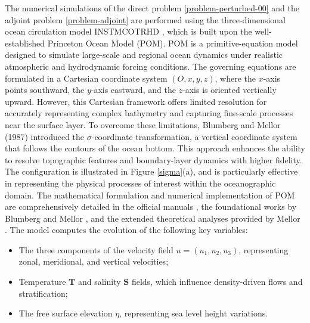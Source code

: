 \documentclass[a4paper,12pt,reqno,natbib]{amsart}
\begin{document}
The numerical simulations of the direct problem \eqref{problem-perturbed-00} and the adjoint problem \eqref{problem-adjoint} are performed using the three-dimensional ocean circulation model INSTMCOTRHD \cite{alioua, marwa}, which is built upon the well-established Princeton Ocean Model (POM). POM is a primitive-equation model designed to simulate large-scale and regional ocean dynamics under realistic atmospheric and hydrodynamic forcing conditions. The governing equations are formulated in a Cartesian coordinate system \( (O, x, y, z) \), where the \( x \)-axis points southward, the \( y \)-axis eastward, and the \( z \)-axis is oriented vertically upward. However, this Cartesian framework offers limited resolution for accurately representing complex bathymetry and capturing fine-scale processes near the surface layer.  To overcome these limitations, Blumberg and Mellor (1987) introduced the $\sigma$-coordinate transformation, a vertical coordinate system that follows the contours of the ocean bottom. This approach enhances the ability to resolve topographic features and boundary-layer dynamics with higher fidelity. The configuration is illustrated in Figure \ref{sigma}(a), and is particularly effective in representing the physical processes of interest within the oceanographic domain. The mathematical formulation and numerical implementation of POM are comprehensively detailed in the official manuals \cite{guide, guide2002}, the foundational works by Blumberg and Mellor \cite{mellor80, mellor87}, and the extended theoretical analyses provided by Mellor \cite{mellor85, mellor98}. The model computes the evolution of the following key variables:
\begin{itemize}
    \item The three components of the velocity field \( u = (u_1, u_2, u_3) \), representing zonal, meridional, and vertical velocities;
    \item Temperature $ \mathbf{T}$ and salinity $ \mathbf{S}$ fields, which influence density-driven flows and stratification;
    \item The free surface elevation \( \eta \), representing sea level height variations.
\end{itemize}

\vspace{0.2cm}
\end{document}

